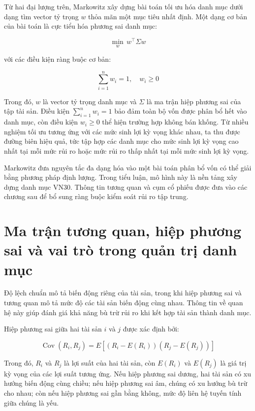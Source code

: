 \documentclass[12pt,a4paper,openany,oneside]{book}
\begin{document}
Từ hai đại lượng trên, Markowitz xây dựng bài toán tối ưu hóa danh mục dưới dạng tìm vector tỷ trọng \(w\) thỏa mãn một mục tiêu nhất định. Một dạng cơ bản của bài toán là cực tiểu hóa phương sai danh mục:

\begin{equation}\label{eq:theory-11}
\min_{w}\,w^{\top}\Sigma w
\end{equation}

với các điều kiện ràng buộc cơ bản:

\begin{equation}\label{eq:theory-12}
\sum_{i=1}^{n}{{w}_{i}}=1,\quad {w}_{i}\geq0
\end{equation}

Trong đó, \(w\) là vector tỷ trọng danh mục và \(\Sigma\) là ma trận hiệp phương sai của tập tài sản. Điều kiện \(\sum_{i=1}^{n}{{w}_{i}}=1\) bảo đảm toàn bộ vốn được phân bổ hết vào danh mục, còn điều kiện \({w}_{i}\geq0\) thể hiện trường hợp không bán khống. Từ nhiều nghiệm tối ưu tương ứng với các mức sinh lợi kỳ vọng khác nhau, ta thu được đường biên hiệu quả, tức tập hợp các danh mục cho mức sinh lợi kỳ vọng cao nhất tại mỗi mức rủi ro hoặc mức rủi ro thấp nhất tại mỗi mức sinh lợi kỳ vọng.

Markowitz đưa nguyên tắc đa dạng hóa vào một bài toán phân bổ vốn có thể giải bằng phương pháp định lượng. Trong tiểu luận, mô hình này là nền tảng xây dựng danh mục VN30. Thông tin tương quan và cụm cổ phiếu được đưa vào các chương sau để bổ sung ràng buộc kiểm soát rủi ro tập trung.

\section{Ma trận tương quan, hiệp phương sai và vai trò trong quản trị danh mục}\label{Toc227188422}
Độ lệch chuẩn mô tả biến động riêng của tài sản, trong khi hiệp phương sai và tương quan mô tả mức độ các tài sản biến động cùng nhau. Thông tin về quan hệ này giúp đánh giá khả năng bù trừ rủi ro khi kết hợp tài sản thành danh mục.

Hiệp phương sai giữa hai tài sản \(i\) và \(j\) được xác định bởi:

\begin{equation}\label{eq:theory-13}
\operatorname{Cov}\left({R}_{i},{R}_{j}\right)=E\left[\left({R}_{i}-E\left({R}_{i}\right)\right)\left({R}_{j}-E\left({R}_{j}\right)\right)\right]
\end{equation}

Trong đó, \({R}_{i}\) và \({R}_{j}\) là lợi suất của hai tài sản, còn \(E\left({R}_{i}\right)\) và \(E\left({R}_{j}\right)\) là giá trị kỳ vọng của các lợi suất tương ứng. Nếu hiệp phương sai dương, hai tài sản có xu hướng biến động cùng chiều; nếu hiệp phương sai âm, chúng có xu hướng bù trừ cho nhau; còn nếu hiệp phương sai gần bằng không, mức độ liên hệ tuyến tính giữa chúng là yếu.
\end{document}
